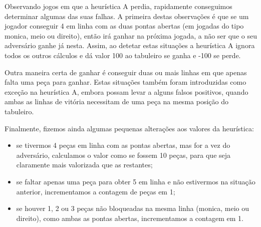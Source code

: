 Observando jogos em que a heurística A perdia, rapidamente conseguimos determinar algumas das suas falhas. A primeira destas observações é que se um jogador conseguir 4 em linha com as duas pontas abertas (em jogadas do tipo monica, meio ou direito), então irá ganhar na próxima jogada, a não ser que o seu adversário ganhe já nesta. Assim, ao detetar estas situações a heurística A ignora todos os outros cálculos e dá valor 100 ao tabuleiro se ganha e -100 se perde.

Outra maneira certa de ganhar é conseguir duas ou mais linhas em que apenas falta uma peça para ganhar. Estas situações também foram introduzidas como exceção na heurística A, embora possam levar a alguns falsos positivos, quando ambas as linhas de vitória necessitam de uma peça na mesma posição do tabuleiro.

Finalmente, fizemos ainda algumas pequenas alterações aos valores da heurística:
\begin{itemize}
	\item se tivermos 4 peças em linha com as pontas abertas, mas for a vez do adversário, calculamos o valor como se fossem 10 peças, para que seja claramente mais valorizada que as restantes;
	\item se faltar apenas uma peça para obter 5 em linha e não estivermos na situação anterior, incrementamos a contagem de peças em 1;
	\item se houver 1, 2 ou 3 peças não bloqueadas na mesma linha (monica, meio ou direito), como ambas as pontas abertas, incrementamos a contagem em 1.
\end{itemize}